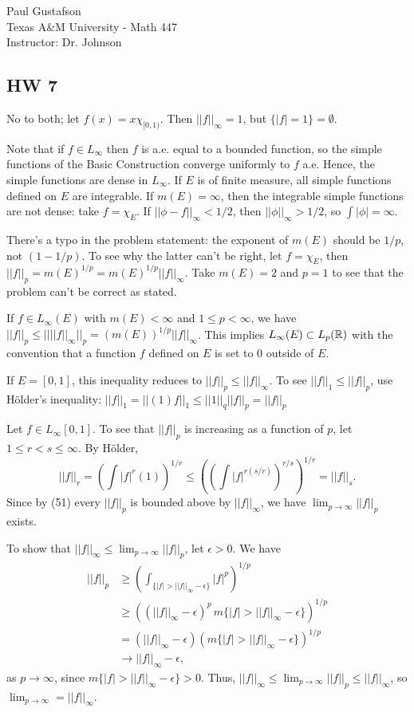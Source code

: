 \documentclass{article}
\begin{document}
\noindent Paul Gustafson\\
\noindent Texas A\&M University - Math 447\\ 
\noindent Instructor: Dr. Johnson

\subsection*{HW 7}
 No to both; let $f(x) = x \chi_{[0,1)}$. Then $||f||_\infty = 1$, but $\{|f| = 1\} = \emptyset$.

 Note that if $f \in L_\infty$ then $f$ is a.e. equal to a bounded function, so the simple functions of the Basic Construction converge uniformly to $f$ a.e. Hence, the simple functions are dense in $L_\infty$.  If $E$ is of finite measure, all simple functions defined on $E$ are integrable.  If $m(E) = \infty$, then the integrable simple functions are not dense: take $f = \chi_E$. If $||\phi - f||_\infty < 1/2$, then $||\phi||_\infty > 1/2$, so $\int |\phi| = \infty$.

 There's a typo in the problem statement: the exponent of $m(E)$ should be $1/p$, not $(1-1/p)$.  To see why the latter can't be right, let $f = \chi_E$, then $||f||_p = m(E)^{1/p} = m(E)^{1/p} ||f||_\infty$. Take $m(E) = 2$ and $p = 1$ to see that the problem can't be correct as stated.

If $f \in L_\infty(E)$ with $m(E) < \infty$ and $1 \le p < \infty$, we have
$||f||_p \le || ||f||_\infty ||_p = (m(E))^{1/p} ||f||_\infty$. This implies $L_\infty(E) \subset L_p(\mathbb{R})$ with the convention that a function $f$ defined on $E$ is set to $0$ outside of $E$.  

If $E = [0,1]$, this inequality reduces to $||f||_p \le ||f||_\infty$. To see $||f||_1 \le ||f||_p$, use H\"{o}lder's inequality: $||f||_1 = ||(1)f||_1 \le ||1||_q ||f||_p = ||f||_p$

 Let $f \in L_\infty[0,1]$. To see that $||f||_p$ is increasing as a function of $p$,  let $1\le r < s \le \infty$. By H\"{o}lder,
$$||f||_r = (\int |f|^r (1))^{1/r} \le ((\int |f|^{r(s/r)})^{r/s})^{1/r} = ||f||_s.$$
Since by (51) every $||f||_p$ is bounded above by $||f||_\infty$, we have $\lim_{p\to\infty} ||f||_p$ exists.

To show that $||f||_\infty \le \lim_{p\to\infty} ||f||_p$, let $\epsilon > 0$. We have
\begin{align*}
||f||_p & \ge (\int_{\{|f| > ||f||_\infty - \epsilon\}} |f|^p )^{1/p}
\\ & \ge ((||f||_\infty - \epsilon)^p \,m\{|f| > ||f||_\infty - \epsilon\})^{1/p}
\\ & = (||f||_\infty - \epsilon) (m\{|f| > ||f||_\infty - \epsilon\})^{1/p}
\\ & \to ||f||_\infty - \epsilon,
\end{align*}
as $p \to \infty$, since $m \{ |f| > ||f||_\infty - \epsilon\} > 0$. Thus,
$||f||_\infty \le \lim_{p\to\infty} ||f||_p \le ||f||_\infty$, so $\lim_{p\to\infty} = ||f||_\infty$.
\end{document}

